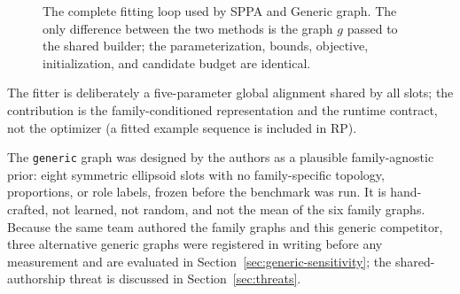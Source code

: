 \documentclass[11pt,a4paper]{article}
\begin{document}
\begin{figure}[!htb]
\centering
{}
\caption{The complete fitting loop used by SPPA and Generic graph. The
only difference between the two methods is the graph \(g\) passed to the
shared builder; the parameterization, bounds, objective, initialization, and
candidate budget are identical.}
\label{alg:mvfit}
\end{figure} The fitter is deliberately a five-parameter global
alignment shared by all slots; the contribution is the family-conditioned
representation and the runtime contract, not the optimizer (a fitted example
sequence is included in RP).

The \texttt{generic} graph was designed by the authors as a plausible
family-agnostic prior: eight symmetric ellipsoid slots with no
family-specific topology, proportions, or role labels, frozen before the
benchmark was run. It is hand-crafted, not learned, not random, and not the
mean of the six family graphs. Because the same team authored the family
graphs and this generic competitor, three alternative generic graphs were
registered in writing before any measurement and are evaluated in
Section~\ref{sec:generic-sensitivity}; the shared-authorship threat is
discussed in Section~\ref{sec:threats}.
\end{document}
